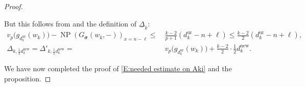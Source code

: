 \documentclass[12pt]{amsart}
\newcommand{\liang}[1]{{\color{blue} \sf $\clubsuit\clubsuit\clubsuit$ Liang: [#1]}}
\theoremstyle{definition}
\numberwithin{equation}{subsection}
\def\rmL{\mathrm{L}}
\DeclareMathOperator{\NP}{NP}
\newcommand{\bbsigma}{\boldsymbol{\sigma}}
\newcommand{\new}{\mathrm{new}}
\newcommand{\Iw}{\mathrm{Iw}}
\newcommand{\ur}{\mathrm{ur}}
\begin{document}
\begin{proof}
\begin{enumerate}
$$$$
But this follows from \cite[Proposition~4.28]{liu-truong-xiao-zhao} and the definition of $\underline \Delta_k$:
\begin{align*}
v_p\big( g_{d_k^\ur}(w_k) \big)-\NP(G_{\bbsigma}(w_{k},-))_{x=n-\ell}\leq\ & \tfrac{k-2}{p+1}(d_k^\ur-n+\ell)\leq \tfrac{k-2}{2}(d_k^\ur-n+\ell),
\\
\Delta_{k,\frac 12 d_k^\new}=\Delta'_{k,\frac 12 d_k^\new}=\ &v_p\big(g_{d_k^\ur}(w_k) \big)+\tfrac {k-2}2\cdot \tfrac 12 d_k^\new.
\end{align*}
\end{enumerate}
We have now completed the proof of \eqref{E:needed estimate on Aki} and the proposition.
\end{proof}

\end{document}
